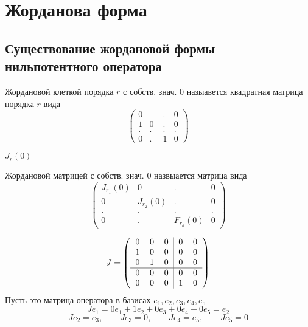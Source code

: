 \chapter{Жорданова форма}

\section{Существование жордановой формы нильпотентного оператора}

\begin{definition}
	Жордановой клеткой порядка $ r $ с собств. знач. $ 0 $ назыавется квадратная матрица порядка $ r $ вида
	$$
	\begin{pmatrix}
		0 & - & . & 0 \\
		1 & 0 & . & 0 \\
		. & . & . & . \\
		0 & . & 1 & 0
	\end{pmatrix} $$
\end{definition}

\begin{notation}
	$ J_r(0) $
\end{notation}

\begin{definition}
	Жордановой матрицей с собств. знач. $ 0 $ назвыается матрица вида
	$$
	\begin{pmatrix}
		J_{r_1}(0) & 0 & . & 0 \\
		0 & J_{r_2}(0) & . & 0 \\
		. & . & . & . \\
		0 & . & F_{r_k}(0) & 0
	\end{pmatrix} $$
\end{definition}

\begin{eg}
	$$ J = \left(
	\begin{tabular}{c c c | c c}
		0 & 0 & 0 & 0 & 0 \\
		1 & 0 & 0 & 0 & 0 \\
		0 & 1 & 0 & 0 & 0 \\
		\hline
		0 & 0 & 0 & 0 & 0 \\
		0 & 0 & 0 & 1 & 0 \\
	\end{tabular} \right) $$
	Пусть это матрица оператора в базисах $ e_1, e_2, e_3, e_4, e_5 $
	$$ Je_1 = 0e_1 + 1e_2 + 0e_3 + 0e_4 + 0e_5 = e_2 $$
	$$ Je_2 = e_3, \qquad Je_3 = 0, \qquad Je_4 = e_5, \qquad Je_5 = 0 $$
\end{eg}

